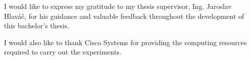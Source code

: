 \documentclass[english,bachelor,bw,unicode,oneside]{ctufit-thesis}
\begin{document}
\frontmatter\frontmatterinit %


\thispagestyle{empty}\maketitle\thispagestyle{empty}\cleardoublepage %


\imprintpage %
\stopTOCentries

\begin{acknowledgmentpage}
    I would like to express my gratitude to my thesis supervisor, Ing. Jaroslav Hlaváč, for his guidance and valuable feedback throughout the development of this bachelor's thesis.

    I would also like to thank Cisco Systems for providing the computing resources required to carry out the experiments.
\end{acknowledgmentpage}
\end{document}
